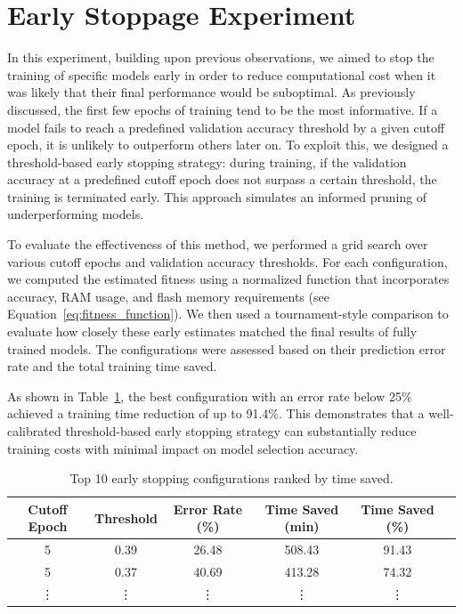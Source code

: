 \section{Early Stoppage Experiment}
In this experiment, building upon previous observations, we aimed to stop the training of specific models early in order to reduce computational cost when it was likely that their final performance would be suboptimal. As previously discussed, the first few epochs of training tend to be the most informative. If a model fails to reach a predefined validation accuracy threshold by a given cutoff epoch, it is unlikely to outperform others later on. To exploit this, we designed a threshold-based early stopping strategy: during training, if the validation accuracy at a predefined cutoff epoch does not surpass a certain threshold, the training is terminated early. This approach simulates an informed pruning of underperforming models.

To evaluate the effectiveness of this method, we performed a grid search over various cutoff epochs and validation accuracy thresholds. For each configuration, we computed the estimated fitness using a normalized function that incorporates accuracy, RAM usage, and flash memory requirements (see Equation~\ref{eq:fitness_function}). We then used a tournament-style comparison to evaluate how closely these early estimates matched the final results of fully trained models. The configurations were assessed based on their prediction error rate and the total training time saved.

As shown in Table~\ref{tab:early_stopping_results}, the best configuration with an error rate below 25\% achieved a training time reduction of up to 91.4\%. This demonstrates that a well-calibrated threshold-based early stopping strategy can substantially reduce training costs with minimal impact on model selection accuracy.


\begin{table}[H]
\centering
\caption{Top 10 early stopping configurations ranked by time saved.}
\label{tab:early_stopping_results}
\begin{tabular}{cccccc}
\toprule
Cutoff Epoch & Threshold & Error Rate (\%) & Time Saved (min) & Time Saved (\%) \\
\midrule
5 & 0.39 & 26.48 & 508.43 & 91.43 \\
5 & 0.37 & 40.69 & 413.28 & 74.32 \\
\vdots & \vdots & \vdots & \vdots & \vdots \\
\bottomrule
\end{tabular}
\end{table}



